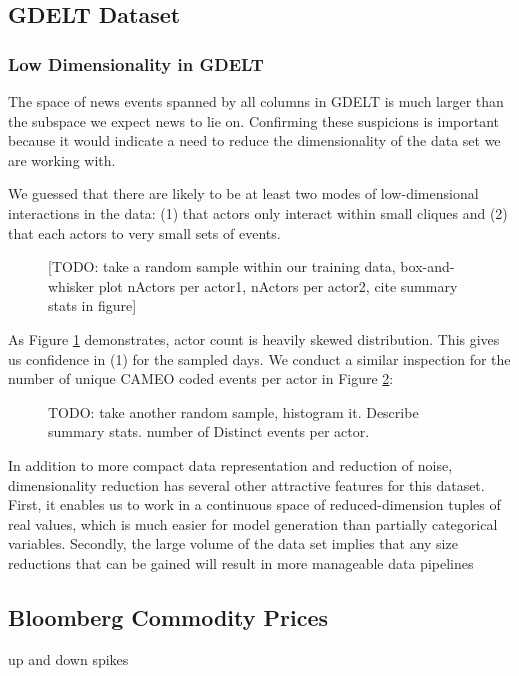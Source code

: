 
\subsection{GDELT Dataset}

\subsubsection{Low Dimensionality in GDELT}

The space of news events spanned by all columns in GDELT is much larger than the subspace we expect news to lie on. Confirming these suspicions is important because it would indicate a need to reduce the dimensionality of the data set we are working with.

We guessed that there are likely to be at least two modes of low-dimensional interactions in the data: (1) that actors only interact within small cliques and (2) that each actors to very small sets of events.

\begin{figure}[h]
\centering
\caption{[TODO: take a random sample within our training data, box-and-whisker plot nActors per actor1, nActors per actor2, cite summary stats in figure]
\label{fig:actors-per-actor}}
\end{figure}

As Figure \ref{fig:actors-per-actor} demonstrates, actor count is heavily skewed distribution. This gives us confidence in (1) for the sampled days. We conduct a similar inspection for the number of unique CAMEO coded events per actor in Figure \ref{fig:events-per-actor}:

\begin{figure}[h]
\centering
\caption{TODO: take another random sample, histogram it. Describe summary stats. number of Distinct events per actor.
\label{fig:events-per-actor}}
\end{figure}

In addition to more compact data representation and reduction of noise, dimensionality reduction has several other attractive features for this dataset. First, it enables us to work in a continuous space of reduced-dimension tuples of real values, which is much easier for model generation than partially categorical variables. Secondly, the large volume of the data set implies that any size reductions that can be gained will result in more manageable data pipelines

\subsection{Bloomberg Commodity Prices}

up and down spikes